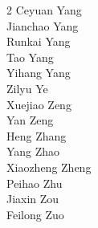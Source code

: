 \begin{multicols}{2}
\color{seedblue}Ceyuan Yang\\
\color{seedblue}Jianchao Yang\\
\color{seedblue}Runkai Yang\\
\color{seedblue}Tao Yang\\
\color{seedblue}Yihang Yang\\
\color{seedblue}Zilyu Ye\\
\color{seedblue}Xuejiao Zeng\\
\color{seedblue}Yan Zeng\\
\color{seedblue}Heng Zhang\\
\color{seedblue}Yang Zhao\\
\color{seedblue}Xiaozheng Zheng\\
\color{seedblue}Peihao Zhu\\
\color{seedblue}Jiaxin Zou\\
\color{seedblue}Feilong Zuo \\
\\


\end{multicols}
